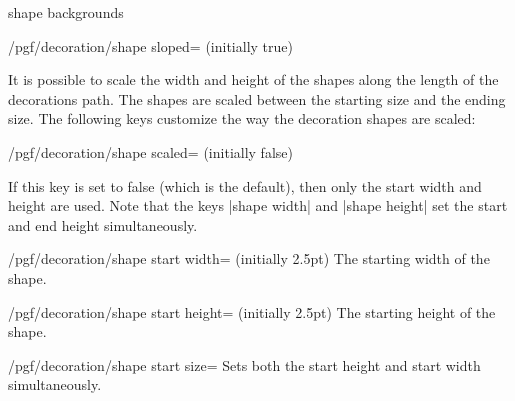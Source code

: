 \begin{decoration}{shape backgrounds}
\begin{key}{/pgf/decoration/shape sloped= (initially true)}
\begin{codeexample}[]
\end{codeexample}
  \end{key}%

  It is possible to scale the width and height of the shapes along the
  length of the decorations path. The shapes are scaled between the starting
  size and the ending size. The following keys customize the way the
  decoration shapes are scaled:
  
  \begin{key}{/pgf/decoration/shape scaled= (initially false)}
\begin{codeexample}[]
\end{codeexample}

    If this key is set to false (which is the default), then only the
    start width and height are used. Note that the keys |shape width|
    and |shape height| set the start and end height simultaneously.
  \end{key}

  \begin{key}{/pgf/decoration/shape start width= (initially 2.5pt)}
    The starting width of the shape.
  \end{key}%

  \begin{key}{/pgf/decoration/shape start height= (initially 2.5pt)}
    The starting height of the shape.
  \end{key}%

  \begin{stylekey}{/pgf/decoration/shape start size=}
    Sets both the start height and start width simultaneously.
  \end{stylekey}%


\end{decoration}
